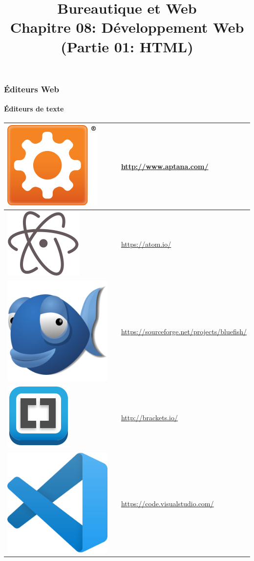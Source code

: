 \documentclass[xcolor=table]{beamer}
\title[BWEB: 08- Web (HTML)] %
{Bureautique et Web \\Chapitre 08: Développement Web (Partie 01: HTML)}
\begin{document}

\begin{frame}
\frametitle{Éditeurs Web}
\framesubtitle{Éditeurs de texte}

\def\arraystretch{0}

\begin{tabular}{p{}cp{}}%
	
	\hline
	
	\includegraphics[height=.8cm]{..//img/Bweb08-dev-web/aptana-logo.png} &
	& 
	\url{http://www.aptana.com/}\\
	
	\hline
	
	\includegraphics[height=.8cm]{..//img/Bweb08-dev-web/atom-logo.png} &
	& 
	\url{https://atom.io/}\\
	
	\hline
	
	\includegraphics[height=.8cm]{..//img/Bweb08-dev-web/bluefish-logo.png} &
	& 
	\url{https://sourceforge.net/projects/bluefish/}\\
	
	\hline
	
	\includegraphics[height=.8cm]{..//img/Bweb08-dev-web/brackets-logo.png} &
	& 
	\url{http://brackets.io/}\\
	
	\hline
	
	\includegraphics[height=.8cm]{..//img/Bweb08-dev-web/visual-studio-code-logo.png} &
	& 
	\url{https://code.visualstudio.com/}\\
	
	\hline
	
\end{tabular}

\end{frame}
\end{document}
